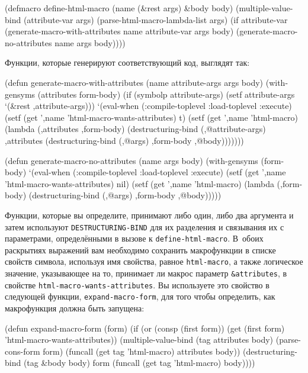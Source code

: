 \begin{myverb}
(defmacro define-html-macro (name (&rest args) &body body)
  (multiple-value-bind (attribute-var args)
      (parse-html-macro-lambda-list args)
    (if attribute-var
      (generate-macro-with-attributes name attribute-var args body)
      (generate-macro-no-attributes name args body))))
\end{myverb}

Функции, которые генерируют соответствующий код, выглядят так:

\begin{myverb}
(defun generate-macro-with-attributes (name attribute-args args body)
  (with-gensyms (attributes form-body)
    (if (symbolp attribute-args) (setf attribute-args `(&rest ,attribute-args)))
    `(eval-when (:compile-toplevel :load-toplevel :execute)
       (setf (get ',name 'html-macro-wants-attributes) t)
       (setf (get ',name 'html-macro) 
             (lambda (,attributes ,form-body)
               (destructuring-bind (,@attribute-args) ,attributes
                 (destructuring-bind (,@args) ,form-body
                   ,@body)))))))

(defun generate-macro-no-attributes (name args body)
  (with-gensyms (form-body)
    `(eval-when (:compile-toplevel :load-toplevel :execute)
       (setf (get ',name 'html-macro-wants-attributes) nil)
       (setf (get ',name 'html-macro)
             (lambda (,form-body)
               (destructuring-bind (,@args) ,form-body ,@body)))))
\end{myverb}

Функции, которые вы определите, принимают либо один, либо два аргумента и затем
используют \lstinline{DESTRUCTURING-BIND} для их разделения и связывания их с
параметрами, определёнными в вызове к \lstinline{define-html-macro}.  В~обоих раскрытиях
выражений вам необходимо сохранить макрофункции в списке свойств символа, используя имя
свойства, равное \lstinline{html-macro}, а также логическое значение, указывающее на то,
принимает ли макрос параметр \lstinline!&attributes!, в свойстве
\lstinline{html-macro-wants-attributes}.  Вы используете это свойство в следующей функции,
\lstinline{expand-macro-form}, для того чтобы определить, как макрофункция должна быть
запущена:

\begin{myverb}
(defun expand-macro-form (form)
  (if (or (consp (first form))
          (get (first form) 'html-macro-wants-attributes))
    (multiple-value-bind (tag attributes body) (parse-cons-form form)
      (funcall (get tag 'html-macro) attributes body))
    (destructuring-bind (tag &body body) form
      (funcall (get tag 'html-macro) body))))
\end{myverb}

